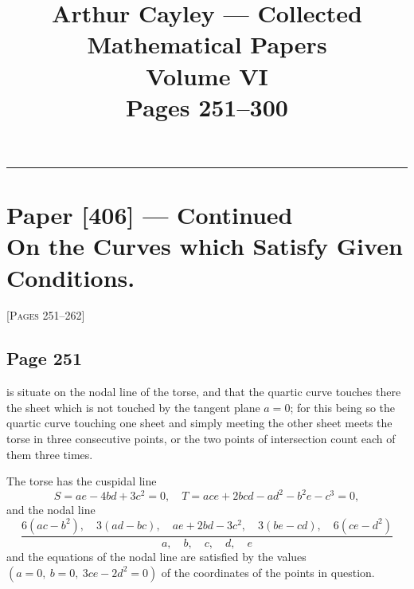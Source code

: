 \documentclass[11pt,a4paper]{article}
\title{\textbf{Arthur Cayley --- Collected Mathematical Papers}\\[6pt]
\Large Volume VI\\[12pt]
\large Pages 251--300}
\author{}
\date{}
\theoremstyle{definition}
\begin{document}
\maketitle
\thispagestyle{fancy}

\noindent\rule{\textwidth}{0.4pt}

\section*{Paper [406] --- Continued\\
\textnormal{On the Curves which Satisfy Given Conditions.}}

\vspace{6pt}
\noindent\textsc{[Pages 251--262]}
\vspace{6pt}

\subsection*{Page 251}

is situate on the nodal line of the torse, and that the quartic curve touches there the sheet which is not touched by the tangent plane $a = 0$; for this being so the quartic curve touching one sheet and simply meeting the other sheet meets the torse in three consecutive points, or the two points of intersection count each of them three times.

The torse has the cuspidal line
\[
S = ae - 4bd + 3c^2 = 0, \quad T = ace + 2bcd - ad^2 - b^2e - c^3 = 0,
\]
and the nodal line
\[
\frac{6(ac-b^2),\quad 3(ad-bc),\quad ae + 2bd - 3c^2,\quad 3(be-cd),\quad 6(ce-d^2)}{a,\quad b,\quad c,\quad d,\quad e}
\]
and the equations of the nodal line are satisfied by the values $(a = 0,\ b = 0,\ 3ce - 2d^2 = 0)$ of the coordinates of the points in question.
\end{document}
